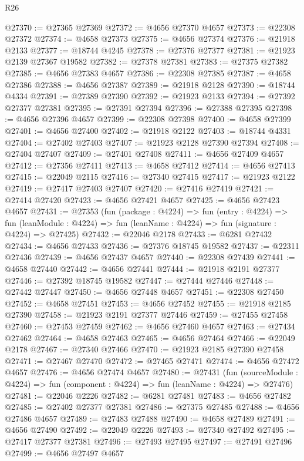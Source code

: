 \begin{lexlean}{R26}
\begin{coremodule}
@27370 := @27365 @27369
@27372 := @4656 @27370 @4657
@27373 := @22308 @27372
@27374 := @4658 @27373
@27375 := @4656 @27374
@27376 := @21918 @2133
@27377 := @18744 @4245
@27378 := @27376 @27377
@27381 := @21923 @2139 @27367 @19582
@27382 := @27378 @27381
@27383 := @27375 @27382
@27385 := @4656 @27383 @4657
@27386 := @22308 @27385
@27387 := @4658 @27386
@27388 := @4656 @27387
@27389 := @21918 @2128
@27390 := @18744 @4334
@27391 := @27389 @27390
@27392 := @21923 @2133
@27394 := @27392 @27377 @27381
@27395 := @27391 @27394
@27396 := @27388 @27395
@27398 := @4656 @27396 @4657
@27399 := @22308 @27398
@27400 := @4658 @27399
@27401 := @4656 @27400
@27402 := @21918 @2122
@27403 := @18744 @4331
@27404 := @27402 @27403
@27407 := @21923 @2128 @27390 @27394
@27408 := @27404 @27407
@27409 := @27401 @27408
@27411 := @4656 @27409 @4657
@27412 := @27356 @27411
@27413 := @4658 @27412
@27414 := @4656 @27413
@27415 := @22049 @2115
@27416 := @27340 @27415
@27417 := @21923 @2122
@27419 := @27417 @27403 @27407
@27420 := @27416 @27419
@27421 := @27414 @27420
@27423 := @4656 @27421 @4657
@27425 := @4656 @27423 @4657
@27431 := @27353
    (fun (package : @4224) =>
    fun (entry : @4224) =>
    fun (leanModule : @4224) => fun (leanName : @4224) => fun (signature : @4224) => @27425)
@27432 := @22046 @2178
@27433 := @6281 @27432
@27434 := @4656 @27433
@27436 := @27376 @18745 @19582
@27437 := @22311 @27436
@27439 := @4656 @27437 @4657
@27440 := @22308 @27439
@27441 := @4658 @27440
@27442 := @4656 @27441
@27444 := @21918 @2191 @27377
@27446 := @27392 @18745 @19582
@27447 := @27444 @27446
@27448 := @27442 @27447
@27450 := @4656 @27448 @4657
@27451 := @22308 @27450
@27452 := @4658 @27451
@27453 := @4656 @27452
@27455 := @21918 @2185 @27390
@27458 := @21923 @2191 @27377 @27446
@27459 := @27455 @27458
@27460 := @27453 @27459
@27462 := @4656 @27460 @4657
@27463 := @27434 @27462
@27464 := @4658 @27463
@27465 := @4656 @27464
@27466 := @22049 @2178
@27467 := @27340 @27466
@27470 := @21923 @2185 @27390 @27458
@27471 := @27467 @27470
@27472 := @27465 @27471
@27474 := @4656 @27472 @4657
@27476 := @4656 @27474 @4657
@27480 := @27431
    (fun (sourceModule : @4224) => fun (component : @4224) => fun (leanName : @4224) => @27476)
@27481 := @22046 @2226
@27482 := @6281 @27481
@27483 := @4656 @27482
@27485 := @27402 @27377 @27381
@27486 := @27375 @27485
@27488 := @4656 @27486 @4657
@27489 := @27483 @27488
@27490 := @4658 @27489
@27491 := @4656 @27490
@27492 := @22049 @2226
@27493 := @27340 @27492
@27495 := @27417 @27377 @27381
@27496 := @27493 @27495
@27497 := @27491 @27496
@27499 := @4656 @27497 @4657

\end{coremodule}
\end{lexlean}
